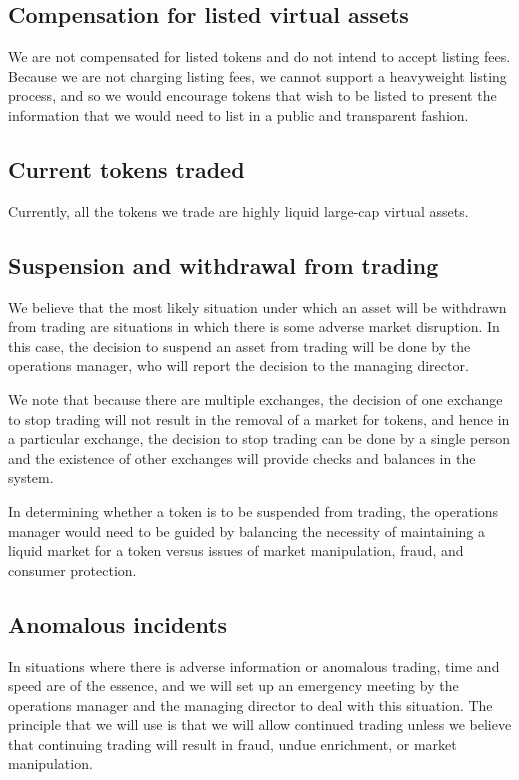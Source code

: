 \subsection{Compensation for listed virtual assets}

We are not compensated for listed tokens and do not intend to accept
listing fees.  Because we are not charging listing fees, we cannot
support a heavyweight listing process, and so we would encourage
tokens that wish to be listed to present the information that we would
need to list in a public and transparent fashion.

\subsection{Current tokens traded}
Currently, all the tokens we trade are highly liquid large-cap
virtual assets.


\subsection{Suspension and withdrawal from trading}
We believe that the most likely situation under which an asset will be
withdrawn from trading are situations in which there is some adverse
market disruption.  In this case, the decision to suspend an asset from
trading will be done by the operations manager, who will report the
decision to the managing director.

We note that because there are multiple exchanges, the decision of one
exchange to stop trading will not result in the removal of a market
for tokens, and hence in a particular exchange, the decision to stop
trading can be done by a single person and the existence of other
exchanges will provide checks and balances in the system.

In determining whether a token is to be suspended from trading, the
operations manager would need to be guided by balancing the necessity
of maintaining a liquid market for a token versus issues of market
manipulation, fraud, and consumer protection.


\subsection{Anomalous incidents}
In situations where there is adverse information or anomalous trading,
time and speed are of the essence, and we will set up an emergency
meeting by the operations manager and the managing director to deal
with this situation.  The principle that we will use is that we will
allow continued trading unless we believe that continuing trading will
result in fraud, undue enrichment, or market manipulation.

